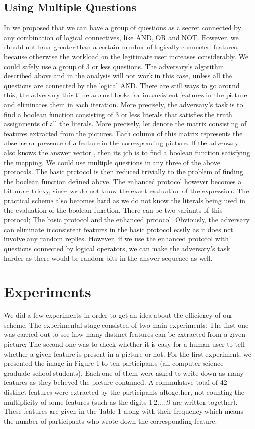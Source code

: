 \documentclass{llncs}
\begin{document}
\subsection{Using Multiple Questions}
In \cite{hassan} we proposed that we can have a group of questions as a secret connected by any combination of logical connectives, like AND, OR and NOT. However, we should not have greater than a certain number of logically connected features, because otherwise the workload on the legitimate user increases considerably. We could safely use a group of 3 or less questions. The adversary's algorithm described above and in the analysis will not work in this case, unless all the questions are connected by the logical AND. There are still ways to go around this, the adversary this time around looks for inconsistent features in the picture and eliminates them in each iteration. More precisely, the adversary's task is to find a boolean function consisting of 3 or less literals that satisfies the truth assignments of all the literals. More precisely, let  denote the matrix consisting of features extracted from the pictures. Each column of this matrix represents the absence or presence of a feature in the corresponding picture. If the adversary also knows the answer vector , then its job is to find a boolean function satisfying the mapping. We could use multiple questions in any three of the above protocols. The basic protocol is then reduced trivially to the problem of finding the boolean function defined above. The enhanced protocol however becomes a bit more tricky, since we do not know the exact evaluation of the expression. The practical scheme also becomes hard as we do not know the literals being used in the evaluation of the boolean function. 
There can be two variants of this protocol; The basic protocol and the enhanced protocol. Obviously, the adversary can eliminate inconsistent features in the basic protocol easily as it does not involve any random replies. However, if we use the enhanced protocol with questions connected by logical operators, we can make the adversary's task harder as there would be random bits in the answer sequence as well. 
\section{Experiments}
We did a few experiments in order to get an idea about the efficiency of our scheme. The experimental stage consisted of two main experiments: The first one was carried out to see how many distinct features can be extracted from a given picture; The second one was to check whether it is easy for a human user to tell whether a given feature is present in a picture or not. For the first experiment, we presented the image in Figure 1 to ten participants (all computer science graduate school students). Each one of them were asked to write down as many features as they believed the picture contained. A commulative total of 42 distinct features were extracted by the participants altogether, not counting the multiplicity of some features (such as the digits 1,2,...,9 are written together). These features are given in the Table 1 along with their frequency which means the number of participants who wrote down the corresponding feature:\\
\end{document}
